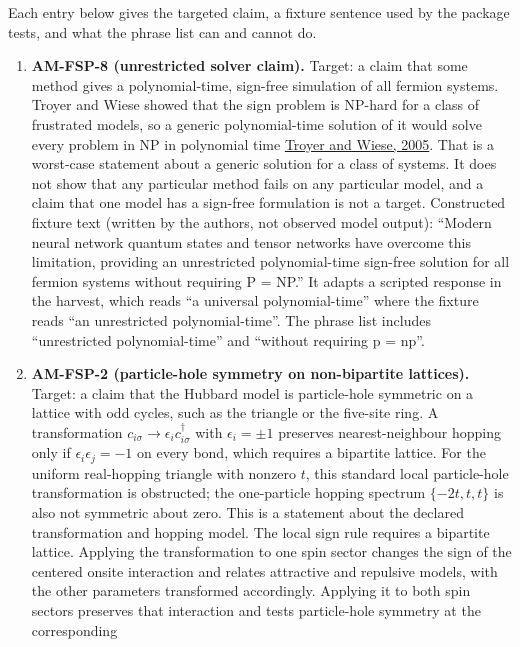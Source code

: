 \documentclass[
  11pt,
]{article}
\begin{document}
Each entry below gives the targeted claim, a fixture sentence used by
the package tests, and what the phrase list can and cannot do.

\begin{enumerate}
\def\labelenumi{\arabic{enumi}.}
\item
  \textbf{AM-FSP-8 (unrestricted solver claim).} Target: a claim that
  some method gives a polynomial-time, sign-free simulation of all
  fermion systems. Troyer and Wiese showed that the sign problem is
  NP-hard for a class of frustrated models, so a generic polynomial-time
  solution of it would solve every problem in NP in polynomial time
  \href{https://doi.org/10.1103/PhysRevLett.94.170201}{Troyer and Wiese,
  2005}. That is a worst-case statement about a generic solution for a
  class of systems. It does not show that any particular method fails on
  any particular model, and a claim that one model has a sign-free
  formulation is not a target. Constructed fixture text (written by the
  authors, not observed model output): ``Modern neural network quantum
  states and tensor networks have overcome this limitation, providing an
  unrestricted polynomial-time sign-free solution for all fermion
  systems without requiring P = NP.'' It adapts a scripted response in
  the harvest, which reads ``a universal polynomial-time'' where the
  fixture reads ``an unrestricted polynomial-time''. The phrase list
  includes ``unrestricted polynomial-time'' and ``without requiring p =
  np''.
\item
  \textbf{AM-FSP-2 (particle-hole symmetry on non-bipartite lattices).}
  Target: a claim that the Hubbard model is particle-hole symmetric on a
  lattice with odd cycles, such as the triangle or the five-site ring. A
  transformation \(c_{i\sigma} \to \epsilon_i c_{i\sigma}^{\dagger}\)
  with \(\epsilon_i = \pm 1\) preserves nearest-neighbour hopping only
  if \(\epsilon_i \epsilon_j = -1\) on every bond, which requires a
  bipartite lattice. For the uniform real-hopping triangle with nonzero
  \(t\), this standard local particle-hole transformation is obstructed;
  the one-particle hopping spectrum \(\{-2t,t,t\}\) is also not
  symmetric about zero. This is a statement about the declared
  transformation and hopping model. The local sign rule requires a
  bipartite lattice. Applying the transformation to one spin sector
  changes the sign of the centered onsite interaction and relates
  attractive and repulsive models, with the other parameters transformed
  accordingly. Applying it to both spin sectors preserves that
  interaction and tests particle-hole symmetry at the corresponding

\end{enumerate}
\end{document}
